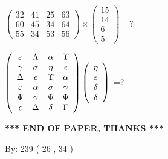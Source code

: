 \documentclass[12pt]{article}
\begin{document}
  
 
$ \left( \begin{array}{ccccccccc}
          32  & 
          41  & 
          25  & 
          63  \\ 
          60  & 
          45  & 
          34  & 
          64  \\ 
          55  & 
          34  & 
          53  & 
          56
\end{array}\right) \times
\left( \begin{array}{c}
          15  \\ 
          14  \\ 
           6  \\ 
           5
\end{array}\right) $ =?
 
 
$  %
 \left( \begin{array}
 {
 c
 c
 c
 c
 }
 \varepsilon & 
 \Lambda & 
 \alpha & 
 \Upsilon \\ 
 \gamma & 
 \sigma & 
 \eta & 
 \epsilon \\ 
 \Delta & 
 \epsilon & 
 \Upsilon & 
 \alpha \\ 
 \varepsilon & 
 \alpha & 
 \sigma & 
 \gamma \\ 
 \Psi & 
 \gamma & 
 \Psi & 
 \Psi \\ 
 \epsilon & 
 \Delta & 
 \delta & 
 \Gamma
 \end{array} \right)
 \left( \begin{array}
 {
 c
 }
 \eta \\ 
 \varepsilon \\ 
 \delta \\ 
 \delta
 \end{array} \right)
$ =?
 

 

 
\vspace{0.3in}
   
   
 \vspace{0.2in}
 
   
   
   
   
\vspace{1.0in} 
{\textbf{\large{ *** END OF PAPER, THANKS *** }}} 
   
   
\hspace{1.0in} By: 
         239 (          26 ,           34 )
   
   
   
   
\newpage 
\setcounter{page}{ 
    27001 } 
   
\end{document}
